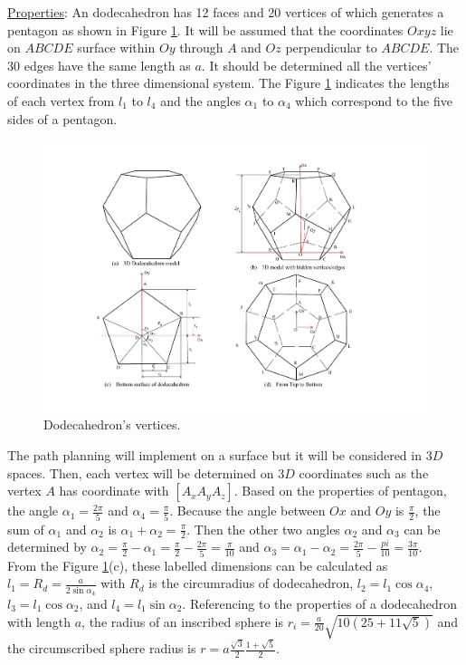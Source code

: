 \noindent\uline{Properties}: 
An dodecahedron has 12 faces and 20 vertices of which generates a pentagon as shown in Figure \ref{fig:dodecahedron2}.
It will be assumed that the coordinates $Oxyz$ lie on $ABCDE$ surface within $Oy$ through $A$ and $Oz$ perpendicular to $ABCDE$.
The 30 edges have the same length as $a$. It should be determined all the vertices' coordinates in the three dimensional system.
The Figure \ref{fig:dodecahedron2} indicates the lengths of each vertex from $l_1$ to $l_4$ and the angles $\alpha_1$ to $\alpha_4$ which correspond to the five sides of a pentagon.

\begin{figure}[h]
\centering
	\includegraphics[width=1\textwidth]{image/dodecahedron2.pdf}
	\caption{Dodecahedron's vertices.}
	\label{fig:dodecahedron2}
\end{figure}

\noindent The path planning will implement on a surface but it will be considered in $3D$ spaces. 
Then, each vertex will be determined on $3D$ coordinates such as the vertex $A$ has coordinate with $[A_x A_y A_z]$. 
Based on the properties of pentagon, the angle $\alpha_1=\frac{2\pi}{5}$ and $\alpha_4=\frac{\pi}{5}$. 
Because the angle between $Ox$ and $Oy$ is $\frac{\pi}{2}$, the sum of $\alpha_1$ and $\alpha_2$ is $\alpha_1 + \alpha_2 = \frac{\pi}{2}$. 
Then the other two angles $\alpha_2$ and $\alpha_3$ can be determined by $\alpha_2 = \frac{\pi}{2}-\alpha_1 = \frac{\pi}{2}-\frac{2\pi}{5} = \frac{\pi}{10}$ and $\alpha_3 = \alpha_1-\alpha_2 = \frac{2\pi}{5}-\frac{pi}{10} = \frac{3\pi}{10}$.\\

\noindent From the Figure \ref{fig:dodecahedron2}(c), these labelled dimensions can be calculated as $l_1 = R_d = \frac{a}{2\sin{\alpha_4}}$ with $R_d$ is the circumradius of dodecahedron, $l_2 = l_1\cos{\alpha_4}$, $l_3 = l_1\cos{\alpha_2}$, and $l_4 = l_1\sin{\alpha_2}$. 
Referencing to the properties of a dodecahedron with length $a$, the radius of an inscribed sphere is $r_i = \frac{a}{20}\sqrt{10(25+11\sqrt{5})}$ and the circumscribed sphere radius is $r = a\frac{\sqrt{3}}{2}\frac{1+\sqrt{5}}{2}$.\\

